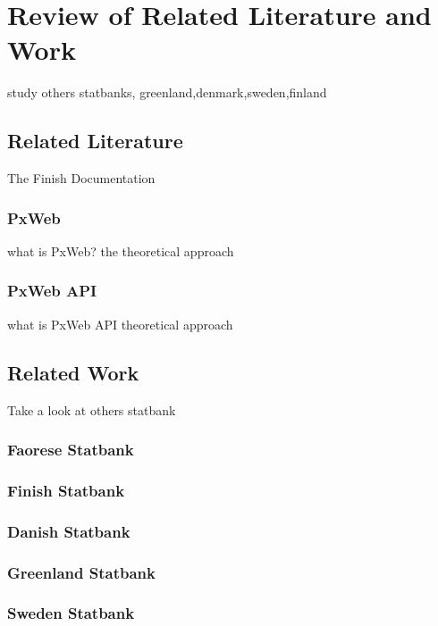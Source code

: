 \chapter{Review of Related
Literature and Work}
study others statbanks, greenland,denmark,sweden,finland

\section{Related Literature}
The Finish Documentation
\subsection{PxWeb}
what is PxWeb? the theoretical approach
\subsection{PxWeb API}
what is PxWeb API theoretical approach 

\section{Related Work}
Take a look at others statbank
\subsection{Faorese Statbank}
\subsection{Finish Statbank}
\subsection{Danish Statbank}
\subsection{Greenland Statbank}
\subsection{Sweden Statbank}